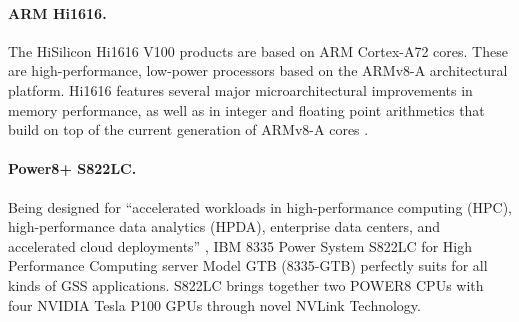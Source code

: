 \paragraph{ARM Hi1616.}
The HiSilicon Hi1616 V100 products are based on ARM Cortex-A72 cores. These are high-performance, low-power processors based on the ARMv8-A architectural platform. %
Hi1616 features several major microarchitectural improvements in memory performance, as well as in integer and floating point arithmetics that build on top of the current generation of ARMv8-A cores \cite{2017:hi1616,2019:hi1616}.

\paragraph{Power8+ S822LC.}
Being designed for ``accelerated workloads in high-performance computing (HPC), high-performance data analytics (HPDA), enterprise data centers, and accelerated cloud deployments'' \cite{2015:power8,2016:power8}, IBM 8335 Power System S822LC for High Performance Computing server Model GTB (8335-GTB) perfectly suits for all kinds of GSS applications. %
S822LC brings together two POWER8 CPUs with four NVIDIA Tesla P100 GPUs through novel NVLink Technology.
